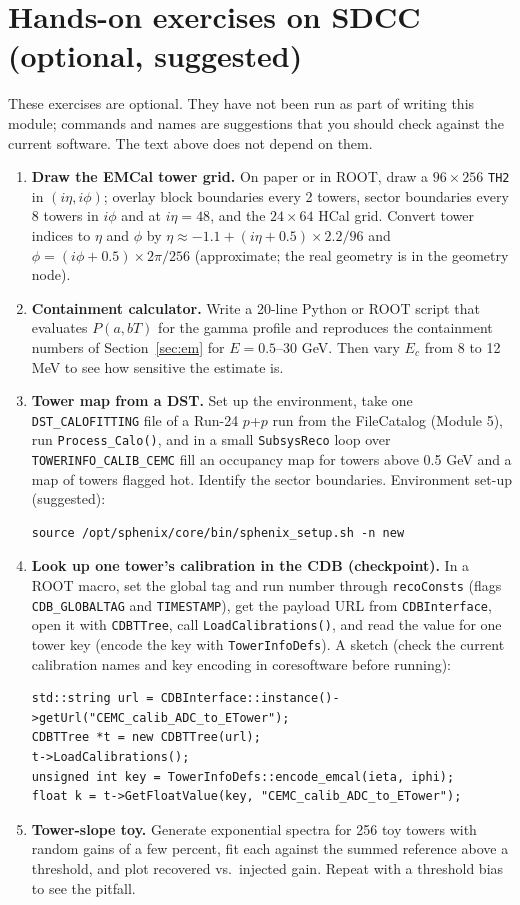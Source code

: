 \documentclass[11pt,letterpaper]{article}
\newcommand{\code}[1]{\texttt{#1}}
\begin{document}
\section{Hands-on exercises on SDCC (optional, suggested)}
These exercises are optional. They have not been run as part of writing this module; commands and names are suggestions that you should check against the current software. The text above does not depend on them.
\begin{enumerate}
\item \textbf{Draw the EMCal tower grid.} On paper or in ROOT, draw a $96\times256$ \code{TH2} in $(i\eta,i\phi)$; overlay block boundaries every 2 towers, sector boundaries every 8 towers in $i\phi$ and at $i\eta=48$, and the $24\times64$ HCal grid. Convert tower indices to $\eta$ and $\phi$ by $\eta\approx-1.1+(i\eta+0.5)\times2.2/96$ and $\phi=(i\phi+0.5)\times2\pi/256$ (approximate; the real geometry is in the geometry node).
\item \textbf{Containment calculator.} Write a 20-line Python or ROOT script that evaluates $P(a,bT)$ for the gamma profile and reproduces the containment numbers of Section~\ref{sec:em} for $E=0.5$--30 GeV. Then vary $E_c$ from 8 to 12 MeV to see how sensitive the estimate is.
\item \textbf{Tower map from a DST.} Set up the environment, take one \code{DST\_CALOFITTING} file of a Run-24 $p$+$p$ run from the FileCatalog (Module 5), run \code{Process\_Calo()}, and in a small \code{SubsysReco} loop over \code{TOWERINFO\_CALIB\_CEMC} fill an occupancy map for towers above 0.5 GeV and a map of towers flagged hot. Identify the sector boundaries. Environment set-up (suggested):
\begin{verbatim}
source /opt/sphenix/core/bin/sphenix_setup.sh -n new
\end{verbatim}
\item \textbf{Look up one tower's calibration in the CDB (checkpoint).} In a ROOT macro, set the global tag and run number through \code{recoConsts} (flags \code{CDB\_GLOBALTAG} and \code{TIMESTAMP}), get the payload URL from \code{CDBInterface}, open it with \code{CDBTTree}, call \code{LoadCalibrations()}, and read the value for one tower key (encode the key with \code{TowerInfoDefs}). A sketch (check the current calibration names and key encoding in coresoftware before running):
{\footnotesize\begin{verbatim}
std::string url = CDBInterface::instance()->getUrl("CEMC_calib_ADC_to_ETower");
CDBTTree *t = new CDBTTree(url);
t->LoadCalibrations();
unsigned int key = TowerInfoDefs::encode_emcal(ieta, iphi);
float k = t->GetFloatValue(key, "CEMC_calib_ADC_to_ETower");
\end{verbatim}}
\item \textbf{Tower-slope toy.} Generate exponential spectra for 256 toy towers with random gains of a few percent, fit each against the summed reference above a threshold, and plot recovered vs.\ injected gain. Repeat with a threshold bias to see the pitfall.
\end{enumerate}
\end{document}
